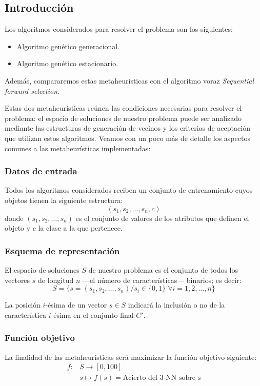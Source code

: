 \documentclass[a4paper, 11pt, titlepage]{article}
\begin{document}
    \subsection{Introducción}

    Los algoritmos considerados para resolver el problema son los siguientes:
    \begin{itemize}
        \item Algoritmo genético generacional.
        \item Algoritmo genético estacionario.
    \end{itemize}

    Además, compararemos estas metaheurísticas con el algoritmo voraz \emph{Sequential forward selection}.

    Estas dos metaheurísticas reúnen las condiciones necesarias para resolver el problema: el espacio de soluciones de nuestro problema puede ser analizado mediante las estructuras de generación de vecinos y los criterios de aceptación que utilizan estos algoritmos. Veamos con un poco más de detalle los aspectos comunes a las metaheurísticas implementadas:

    \subsubsection*{Datos de entrada}
    Todos los algoritmos considerados reciben un conjunto de entrenamiento cuyos objetos tienen la siguiente estructura:
    \[
    (s_1, s_2, \dots, s_n, c)
    \]
    donde $(s_1, s_2, \dots, s_n)$ es el conjunto de valores de los atributos que definen el objeto y $c$ la clase a la que pertenece.

    \subsubsection*{Esquema de representación}
    El espacio de soluciones $S$ de nuestro problema es el conjunto de todos los vectores $s$ de longitud $n$ ---el número de características--- binarios; es decir:
    \[
    S = \{s = (s_1, s_2, \dots, s_n) / s_i \in \{0,1\} \;\forall i = 1, 2, \dots, n\}
    \]

    La posición $i$-ésima de un vector $s \in S$ indicará la inclusión o no de la característica $i$-ésima en el conjunto final $C'$.

    \subsubsection*{Función objetivo}
    La finalidad de las metaheurísticas será maximizar la función objetivo siguiente:
    \begin{align*}
        f \colon &S \to [0,100] \\
        &s \mapsto f(s) = \textrm{Acierto del 3-NN sobre s}
    \end{align*}
\end{document}

